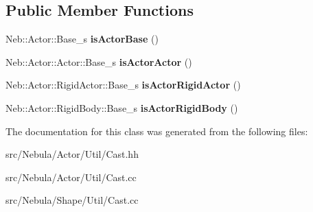 \subsection*{\-Public \-Member \-Functions}
\begin{DoxyCompactItemize}
\item 
\hypertarget{classNeb_1_1Actor_1_1Util_1_1Cast_ab9c1dab6a3875c423ca7671cddb0cd7e}{\-Neb\-::\-Actor\-::\-Base\-\_\-s {\bfseries is\-Actor\-Base} ()}\label{classNeb_1_1Actor_1_1Util_1_1Cast_ab9c1dab6a3875c423ca7671cddb0cd7e}

\item 
\hypertarget{classNeb_1_1Actor_1_1Util_1_1Cast_ac19ce3e3a25ad35de625e0892a53e5d2}{\-Neb\-::\-Actor\-::\-Actor\-::\-Base\-\_\-s {\bfseries is\-Actor\-Actor} ()}\label{classNeb_1_1Actor_1_1Util_1_1Cast_ac19ce3e3a25ad35de625e0892a53e5d2}

\item 
\hypertarget{classNeb_1_1Actor_1_1Util_1_1Cast_ab2814b241f6b9648402f535ece216acb}{\-Neb\-::\-Actor\-::\-Rigid\-Actor\-::\-Base\-\_\-s {\bfseries is\-Actor\-Rigid\-Actor} ()}\label{classNeb_1_1Actor_1_1Util_1_1Cast_ab2814b241f6b9648402f535ece216acb}

\item 
\hypertarget{classNeb_1_1Actor_1_1Util_1_1Cast_a949be90aaffe1ee5267bb4f5722ff095}{\-Neb\-::\-Actor\-::\-Rigid\-Body\-::\-Base\-\_\-s {\bfseries is\-Actor\-Rigid\-Body} ()}\label{classNeb_1_1Actor_1_1Util_1_1Cast_a949be90aaffe1ee5267bb4f5722ff095}

\end{DoxyCompactItemize}


\-The documentation for this class was generated from the following files\-:\begin{DoxyCompactItemize}
\item 
src/\-Nebula/\-Actor/\-Util/\-Cast.\-hh\item 
src/\-Nebula/\-Actor/\-Util/\-Cast.\-cc\item 
src/\-Nebula/\-Shape/\-Util/\-Cast.\-cc\end{DoxyCompactItemize}
